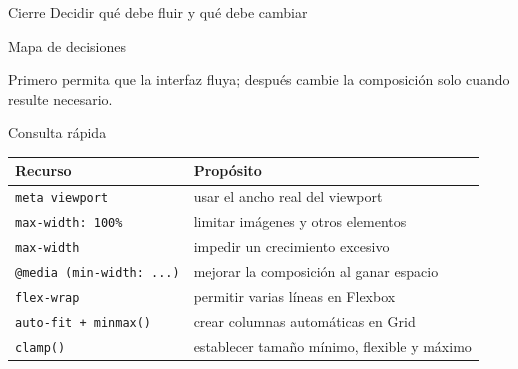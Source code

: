 \documentclass[aspectratio=169,11pt]{beamer}
\begin{document}
    \SectionSlide
    {Cierre}
    {Decidir qué debe fluir y qué debe cambiar}

    \begin{frame}{Mapa de decisiones}
        \begin{center}
        \end{center}

        Primero permita que la interfaz fluya; después cambie la composición
        solo cuando resulte necesario.
    \end{frame}

    \begin{frame}{Consulta rápida}
        \begin{center}
            \small
            \begin{tabular}{p{5.0cm}p{7.5cm}}
                \toprule
                \textbf{Recurso} & \textbf{Propósito} \\
                \midrule
                \texttt{meta viewport} & usar el ancho real del viewport \\
                \texttt{max-width: 100\%} & limitar imágenes y otros elementos \\
                \texttt{max-width} & impedir un crecimiento excesivo \\
                \texttt{@media (min-width: ...)} & mejorar la composición al ganar espacio \\
                \texttt{flex-wrap} & permitir varias líneas en Flexbox \\
                \texttt{auto-fit + minmax()} & crear columnas automáticas en Grid \\
                \texttt{clamp()} & establecer tamaño mínimo, flexible y máximo \\
                \bottomrule
            \end{tabular}
        \end{center}
    \end{frame}
\end{document}
